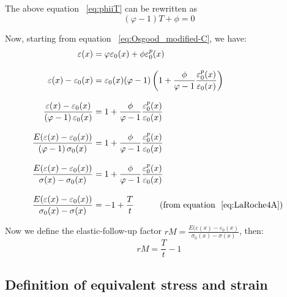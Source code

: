\documentclass[10pt,a4paper]{article}
\begin{document}
The above equation ~\eqref{eq:phiiT} can be rewritten as 
\begin{equation}
\left( \varphi-1 \right)T+\phi=0
\label{eq:LaRoche4A} 
\end{equation}

Now, starting from equation ~\eqref{eq:Osgood_modified-C}, we have:
\begin{align} 
\varepsilon(x)  &= \varphi \varepsilon_0(x)  + \phi \varepsilon_0^{p}(x)  \notag \\[3mm]
\varepsilon(x) - \varepsilon_0(x) &=\varepsilon_0(x)  (\varphi-1) \left(1+\frac{\phi}{\varphi-1}\frac{\varepsilon_0^p(x)}{\varepsilon_0(x)}\right) \notag \\[3mm]
\frac{\varepsilon(x)-\varepsilon_0(x)}{ \left(\varphi-1 \right)\varepsilon_0(x)} &= 1+\frac{\phi}{\varphi-1}\frac{\varepsilon_0^p(x)}{\varepsilon_0(x)} \notag \\[3mm]
\frac{E(\varepsilon(x)-\varepsilon_0(x))}{ \left(\varphi-1 \right)\sigma_0(x)} &= 1+\frac{\phi}{\varphi-1}\frac{\varepsilon_0^p(x)}{\varepsilon_0(x)} \notag \\[3mm]
\frac{E(\varepsilon(x)-\varepsilon_0(x))}{ \sigma(x)-\sigma_0(x)} &= 1+\frac{\phi}{\varphi-1}\frac{\varepsilon_0^p(x)}{\varepsilon_0(x)} \notag \\[3mm]
\frac{E(\varepsilon(x)-\varepsilon_0(x))}{ \sigma_0(x)-\sigma(x)} &= -1+\frac{T}{t} \text{             \ \ \ \ \ \ \ \    (from equation ~\eqref{eq:LaRoche4A})  }
\end{align}




Now we define the elastic-follow-up factor $rM=\frac{E(\varepsilon(x) - \varepsilon_0(x)}{ \sigma_0(x)-\sigma(x) }  $, then:
	\begin{equation}
		rM    =\frac{T}{t} -1
		\label{def:EFU}
	\end{equation}

\subsection{Definition of equivalent stress and strain}
\label{sec:equivalent_sigma_epsilon_eq}
\end{document}
